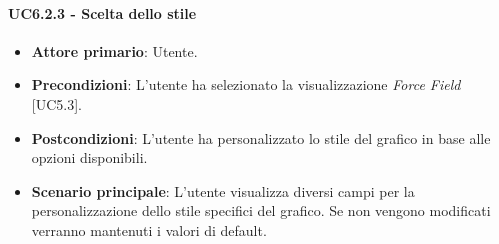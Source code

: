 \paragraph{UC6.2.3 - Scelta dello stile}
\begin{itemize}
	\item \textbf{Attore primario}: Utente.
	\item \textbf{Precondizioni}: L'utente ha selezionato la visualizzazione \textit{Force Field} [UC5.3].
	\item \textbf{Postcondizioni}: L'utente ha personalizzato lo stile del grafico in base alle opzioni disponibili. 
	
	\item \textbf{Scenario principale}: L'utente visualizza diversi campi per la personalizzazione dello stile specifici del grafico. Se non vengono modificati verranno mantenuti i valori di default. 
\end{itemize}